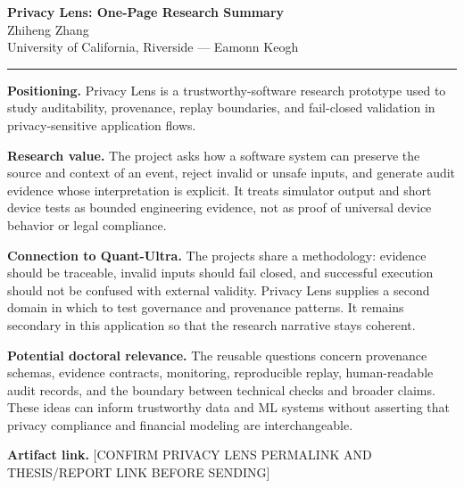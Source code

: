 \documentclass[11pt]{article}
\newcommand{\ApplicantName}{Zhiheng Zhang}
\begin{document}
\begin{center}
{\LARGE\bfseries Privacy Lens: One-Page Research Summary}\\[0.25em]
{\large \ApplicantName}\\
University of California, Riverside --- Eamonn Keogh
\end{center}
\vspace{0.35em}\hrule\vspace{0.65em}

\textbf{Positioning.} Privacy Lens is a trustworthy-software research prototype used to study auditability, provenance, replay boundaries, and fail-closed validation in privacy-sensitive application flows.

\textbf{Research value.} The project asks how a software system can preserve the source and context of an event, reject invalid or unsafe inputs, and generate audit evidence whose interpretation is explicit. It treats simulator output and short device tests as bounded engineering evidence, not as proof of universal device behavior or legal compliance.

\textbf{Connection to Quant-Ultra.} The projects share a methodology: evidence should be traceable, invalid inputs should fail closed, and successful execution should not be confused with external validity. Privacy Lens supplies a second domain in which to test governance and provenance patterns. It remains secondary in this application so that the research narrative stays coherent.

\textbf{Potential doctoral relevance.} The reusable questions concern provenance schemas, evidence contracts, monitoring, reproducible replay, human-readable audit records, and the boundary between technical checks and broader claims. These ideas can inform trustworthy data and ML systems without asserting that privacy compliance and financial modeling are interchangeable.

\textbf{Artifact link.} [CONFIRM PRIVACY LENS PERMALINK AND THESIS/REPORT LINK BEFORE SENDING]
\end{document}
